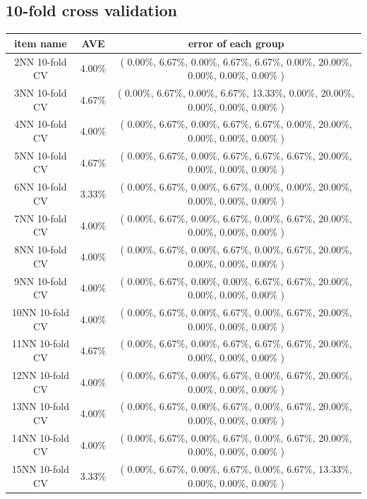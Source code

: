 \documentclass[11pt,a4paper]{article}
\begin{document}
\subsection{10-fold cross validation}
\begin{center}
    \begin{tabular} {|| c | c | c ||}
        \hline
        item name & AVE & error of each group \\ \hline
2NN 10-fold CV & 4.00\% & ( 0.00\%, 6.67\%, 0.00\%, 6.67\%, 6.67\%, 0.00\%, 20.00\%, 0.00\%, 0.00\%, 0.00\% ) \\ \hline
3NN 10-fold CV & 4.67\% & ( 0.00\%, 6.67\%, 0.00\%, 6.67\%, 13.33\%, 0.00\%, 20.00\%, 0.00\%, 0.00\%, 0.00\% ) \\ \hline
4NN 10-fold CV & 4.00\% & ( 0.00\%, 6.67\%, 0.00\%, 6.67\%, 6.67\%, 0.00\%, 20.00\%, 0.00\%, 0.00\%, 0.00\% ) \\ \hline
5NN 10-fold CV & 4.67\% & ( 0.00\%, 6.67\%, 0.00\%, 6.67\%, 6.67\%, 6.67\%, 20.00\%, 0.00\%, 0.00\%, 0.00\% ) \\ \hline
6NN 10-fold CV & 3.33\% & ( 0.00\%, 6.67\%, 0.00\%, 6.67\%, 0.00\%, 0.00\%, 20.00\%, 0.00\%, 0.00\%, 0.00\% ) \\ \hline
7NN 10-fold CV & 4.00\% & ( 0.00\%, 6.67\%, 0.00\%, 6.67\%, 0.00\%, 6.67\%, 20.00\%, 0.00\%, 0.00\%, 0.00\% ) \\ \hline
8NN 10-fold CV & 4.00\% & ( 0.00\%, 6.67\%, 0.00\%, 6.67\%, 0.00\%, 6.67\%, 20.00\%, 0.00\%, 0.00\%, 0.00\% ) \\ \hline
9NN 10-fold CV & 4.00\% & ( 0.00\%, 6.67\%, 0.00\%, 0.00\%, 6.67\%, 6.67\%, 20.00\%, 0.00\%, 0.00\%, 0.00\% ) \\ \hline
10NN 10-fold CV & 4.00\% & ( 0.00\%, 6.67\%, 0.00\%, 6.67\%, 0.00\%, 6.67\%, 20.00\%, 0.00\%, 0.00\%, 0.00\% ) \\ \hline
11NN 10-fold CV & 4.67\% & ( 0.00\%, 6.67\%, 0.00\%, 6.67\%, 6.67\%, 6.67\%, 20.00\%, 0.00\%, 0.00\%, 0.00\% ) \\ \hline
12NN 10-fold CV & 4.00\% & ( 0.00\%, 6.67\%, 0.00\%, 6.67\%, 0.00\%, 6.67\%, 20.00\%, 0.00\%, 0.00\%, 0.00\% ) \\ \hline
13NN 10-fold CV & 4.00\% & ( 0.00\%, 6.67\%, 0.00\%, 6.67\%, 0.00\%, 6.67\%, 20.00\%, 0.00\%, 0.00\%, 0.00\% ) \\ \hline
14NN 10-fold CV & 4.00\% & ( 0.00\%, 6.67\%, 0.00\%, 6.67\%, 0.00\%, 6.67\%, 20.00\%, 0.00\%, 0.00\%, 0.00\% ) \\ \hline
15NN 10-fold CV & 3.33\% & ( 0.00\%, 6.67\%, 0.00\%, 6.67\%, 0.00\%, 6.67\%, 13.33\%, 0.00\%, 0.00\%, 0.00\% ) \\ \hline

\end{tabular}
\end{center}
\end{document}
